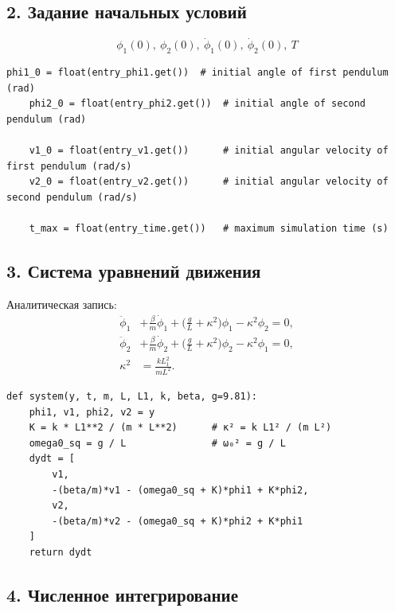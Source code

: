 \documentclass[a4paper,11pt]{article}
\theoremstyle{definition}
\begin{document}
\subsection*{2. Задание начальных условий}
\begin{equation}
  \phi_1(0),\ \phi_2(0),\ \dot{\phi}_1(0),\ \dot{\phi}_2(0),\ T\label{eq:equation}
\end{equation}

\begin{lstlisting}[language=MyPython,label={lst:lstlisting2}]
    phi1_0 = float(entry_phi1.get())  # initial angle of first pendulum (rad)
    phi2_0 = float(entry_phi2.get())  # initial angle of second pendulum (rad)

    v1_0 = float(entry_v1.get())      # initial angular velocity of first pendulum (rad/s)
    v2_0 = float(entry_v2.get())      # initial angular velocity of second pendulum (rad/s)

    t_max = float(entry_time.get())   # maximum simulation time (s)
\end{lstlisting}

\subsection*{3. Система уравнений движения}

Аналитическая запись:
\begin{align*}
  \ddot{\phi}_1 &+ \frac{\beta}{m} \dot{\phi}_1 + \bigl(\tfrac{g}{L} + \kappa^2\bigr)\phi_1 - \kappa^2 \phi_2 = 0, \\
  \ddot{\phi}_2 &+ \frac{\beta}{m} \dot{\phi}_2 + \bigl(\tfrac{g}{L} + \kappa^2\bigr)\phi_2 - \kappa^2 \phi_1 = 0, \\
  \kappa^2 &= \frac{k L_1^2}{m L^2}.
\end{align*}

\begin{lstlisting}[language=MyPython,label={lst:lstlisting}]
def system(y, t, m, L, L1, k, beta, g=9.81):
    phi1, v1, phi2, v2 = y
    K = k * L1**2 / (m * L**2)      # κ² = k L1² / (m L²)
    omega0_sq = g / L               # ω₀² = g / L
    dydt = [
        v1,
        -(beta/m)*v1 - (omega0_sq + K)*phi1 + K*phi2,
        v2,
        -(beta/m)*v2 - (omega0_sq + K)*phi2 + K*phi1
    ]
    return dydt
\end{lstlisting}

\subsection*{4. Численное интегрирование}
\end{document}

